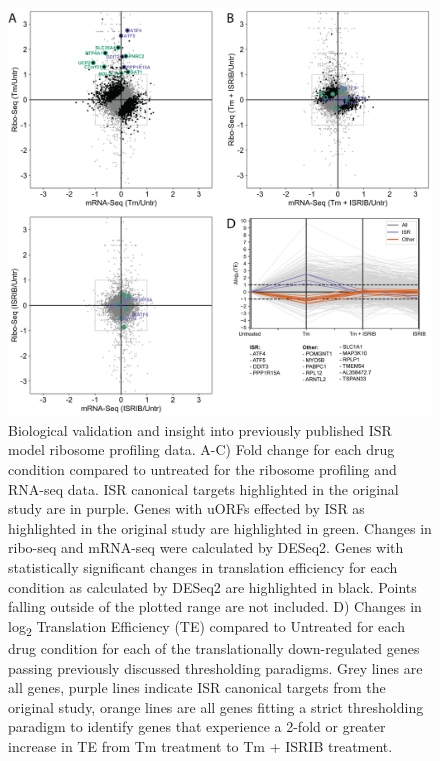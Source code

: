 \documentclass[11pt, a4paper, oneside]{article}
\begin{document}
\begin{figure}
\centering
  \includegraphics[width=180mm]{figures/xpresspipe_figure3.png}
  \caption{Biological validation and insight into previously published ISR model ribosome profiling data. A-C) Fold change for each drug condition compared to untreated for the ribosome profiling and RNA-seq data. ISR canonical targets highlighted in the original study are in purple. Genes with uORFs effected by ISR as highlighted in the original study are highlighted in green. Changes in ribo-seq and mRNA-seq were calculated by DESeq2. Genes with statistically significant changes in translation efficiency for each condition as calculated by DESeq2 are highlighted in black. Points falling outside of the plotted range are not included. D) Changes in log\textsubscript{2} Translation Efficiency (TE) compared to Untreated for each drug condition for each of the translationally down-regulated genes passing previously discussed thresholding paradigms. Grey lines are all genes, purple lines indicate ISR canonical targets from the original study, orange lines are all genes fitting a strict thresholding paradigm to identify genes that experience a 2-fold or greater increase in TE from Tm treatment to Tm + ISRIB treatment.}
  \label{fig:figure3}
\end{figure}
\end{document}
